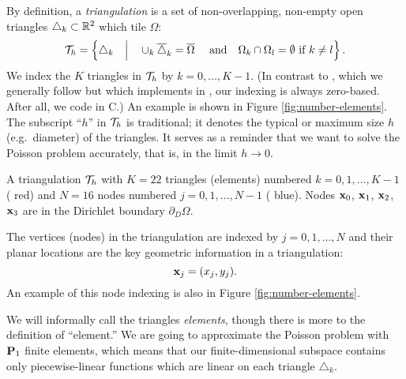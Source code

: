By definition, a \emph{triangulation} is a set of non-overlapping, non-empty open triangles $\triangle_k\subset \mathbb{R}^2$ which tile $\Omega$:
\begin{equation*}
\mathcal{T}_h = \left\{\triangle_k \quad\Big|\quad \cup_k \overline{\triangle}_k = \overline{\Omega} \quad \text{ and} \quad \Omega_k \cap \Omega_l = \emptyset \text{ if } k\ne l\right\}.
\end{equation*}
We index the $K$ triangles in $\mathcal{T}_h$ by $k=0,\dots,K-1$.  (In contrast to \citet{Elmanetal2005}, which we generally follow but which implements in \Matlab, our indexing is always zero-based.  After all, we code in C.)  An example is shown in Figure \ref{fig:number-elements}.  The subscript ``$h$'' in $\mathcal{T}_h$ is traditional; it denotes the typical or maximum size $h$ (e.g.~diameter) of the triangles.  It serves as a reminder that we want to solve the Poisson problem accurately, that is, in the limit $h\to 0$.

\begin{marginfigure}

\caption{A triangulation $\mathcal{T}_h$ with $K=22$ triangles (elements) numbered $k=0,1,\dots,K-1$ ({\color{red} red}) and $N=16$ nodes numbered $j=0,1,\dots,N-1$  ({\color{blue} blue}).  Nodes $\mathbf{x}_0$, $\mathbf{x}_1$, $\mathbf{x}_2$, $\mathbf{x}_3$ are in the Dirichlet boundary $\partial_D\Omega$.}
\label{fig:number-elements}
\end{marginfigure}

The vertices (nodes) in the triangulation are indexed by $j=0,1,\dots,N$ and their planar locations are the key geometric information in a triangulation:
\begin{equation*}
\mathbf{x}_j = (x_j,y_j).
\end{equation*}
An example of this node indexing is also in Figure \ref{fig:number-elements}.

We will informally call the triangles \emph{elements}, though there is more to the definition of ``element.''  We are going to approximate the Poisson problem with $\mathbf{P}_1$ finite elements, which means that our finite-dimensional subspace contains only piecewise-linear functions which are linear on each triangle $\triangle_k$.


